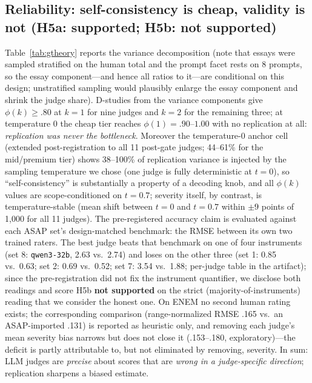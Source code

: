 \documentclass[fleqn,10pt]{JLA_article}
\begin{document}
\subsection{Reliability: self-consistency is cheap, validity is not (H5a: supported; H5b: not supported)}
\label{sec:gtheory}

Table~\ref{tab:gtheory} reports the variance decomposition (note that essays were sampled stratified on the human total and the prompt facet rests on 8 prompts, so the essay component---and hence all ratios to it---are conditional on this design; unstratified sampling would plausibly enlarge the essay component and shrink the judge share). D-studies from the variance components give $\phi(k) \geq .80$ at $k{=}1$ for nine judges and $k{=}2$ for the remaining three; at temperature 0 the cheap tier reaches $\phi(1) = .90$--$1.00$ with no
replication at all: \emph{replication was never the bottleneck}. Moreover the temperature-0
anchor cell (extended post-registration to all 11 post-gate judges; 44--61\% for the mid/premium tier) shows 38--100\% of replication variance is injected by the sampling temperature we
chose (one judge is fully deterministic at $t{=}0$), so ``self-consistency'' is substantially a property of a decoding knob, and all $\phi(k)$ values are scope-conditioned on $t{=}0.7$; severity itself, by contrast, is temperature-stable (mean shift between $t{=}0$ and $t{=}0.7$ within $\pm 9$ points of 1{,}000 for all 11 judges).
The pre-registered accuracy claim is evaluated against each ASAP set's design-matched benchmark: the RMSE between its own two trained raters. The best judge beats that benchmark on one of four instruments (set 8: \texttt{qwen3-32b}, 2.63 vs.\ 2.74) and loses on the other three (set 1: 0.85 vs.\ 0.63; set 2: 0.69 vs.\ 0.52; set 7: 3.54 vs.\ 1.88; per-judge table in the artifact); since
the pre-registration did not fix the instrument quantifier, we disclose both readings and score
H5b \textbf{not supported} on the strict (majority-of-instruments) reading that we consider
the honest one. On ENEM no second human rating exists; the corresponding comparison
(range-normalized RMSE .165 vs.\ an ASAP-imported .131) is reported as heuristic only, and
removing each judge's mean severity bias narrows but does not close it (.153--.180,
exploratory)---the deficit is partly attributable to, but not eliminated by removing,
severity. In sum: LLM judges are \emph{precise} about scores that are \emph{wrong in a judge-specific direction}; replication sharpens a biased estimate.
\end{document}
